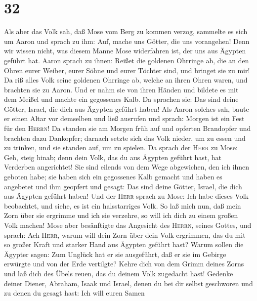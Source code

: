 \hypertarget{section-31}{%
\section{32}\label{section-31}}

 Als aber das Volk sah, daß Mose vom Berg zu kommen
verzog, sammelte es sich um Aaron und sprach zu ihm: Auf, mache uns
Götter, die uns vorangehen! Denn wir wissen nicht, was diesem Manne Mose
widerfahren ist, der uns aus Ägypten geführt hat.  Aaron
sprach zu ihnen: Reißet die goldenen Ohrringe ab, die an den Ohren eurer
Weiber, eurer Söhne und eurer Töchter sind, und bringet sie zu mir!
 Da riß alles Volk seine goldenen Ohrringe ab, welche an
ihren Ohren waren, und brachten sie zu Aaron.  Und er nahm
sie von ihren Händen und bildete es mit dem Meißel und machte ein
gegossenes Kalb. Da sprachen sie: Das sind deine Götter, Israel, die
dich aus Ägypten geführt haben!  Als Aaron solches sah,
baute er einen Altar vor demselben und ließ ausrufen und sprach: Morgen
ist ein Fest für den \textsc{Herrn}!  Da standen sie am
Morgen früh auf und opferten Brandopfer und brachten dazu Dankopfer;
darnach setzte sich das Volk nieder, um zu essen und zu trinken, und sie
standen auf, um zu spielen.  Da sprach der \textsc{Herr}
zu Mose: Geh, steig hinab; denn dein Volk, das du aus Ägypten geführt
hast, hat Verderben angerichtet!  Sie sind eilends von dem
Wege abgewichen, den ich ihnen geboten habe; sie haben sich ein
gegossenes Kalb gemacht und haben es angebetet und ihm geopfert und
gesagt: Das sind deine Götter, Israel, die dich aus Ägypten geführt
haben!  Und der \textsc{Herr} sprach zu Mose: Ich habe
dieses Volk beobachtet, und siehe, es ist ein halsstarriges Volk.
 So laß mich nun, daß mein Zorn über sie ergrimme und ich
sie verzehre, so will ich dich zu einem großen Volk machen!
 Mose aber besänftigte das Angesicht des \textsc{Herrn},
seines Gottes, und sprach: Ach \textsc{Herr}, warum will dein Zorn über
dein Volk ergrimmen, das du mit so großer Kraft und starker Hand aus
Ägypten geführt hast?  Warum sollen die Ägypter sagen:
Zum Unglück hat er sie ausgeführt, daß er sie im Gebirge erwürgte und
von der Erde vertilgte? Kehre dich von dem Grimm deines Zorns und laß
dich des Übels reuen, das du deinem Volk zugedacht hast! 
Gedenke deiner Diener, Abraham, Isaak und Israel, denen du bei dir
selbst geschworen und zu denen du gesagt hast: Ich will euren Samen
